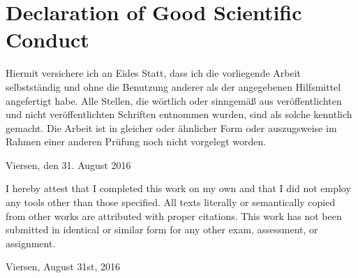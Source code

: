 \section*{Declaration of Good Scientific Conduct}

Hiermit versichere ich an Eides Statt, dass ich die vorliegende Arbeit selbstständig und ohne die Benutzung anderer als der angegebenen Hilfsmittel angefertigt habe. 
Alle Stellen, die wörtlich oder sinngemäß aus veröffentlichten und nicht veröffentlichten Schriften entnommen wurden, sind als solche kenntlich gemacht. 
Die Arbeit ist in gleicher oder ähnlicher Form oder auszugsweise im Rahmen einer anderen Prüfung noch nicht vorgelegt worden.
\vspace{15mm}
\begin{flushleft}
    Viersen, den 31. August 2016
\end{flushleft}
\vspace{30mm}
I hereby attest that I completed this work on my own and that I did not employ any tools other than those specified. 
All texts literally or semantically copied from other works are attributed with proper citations. 
This work has not been submitted in identical or similar form for any other exam, assessment, or assignment.
\vspace{15mm}
\begin{flushleft}
    Viersen, August 31st, 2016
\end{flushleft}
	